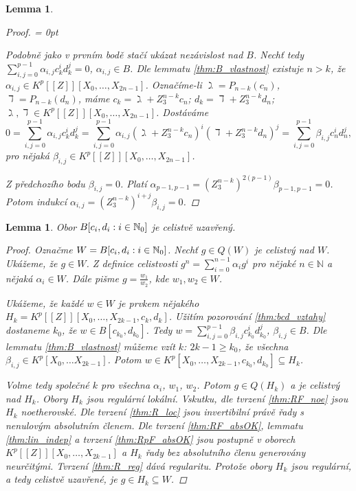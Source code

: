 \documentclass[11pt,a4paper]{article}
\newcommand\m[1]{\mathbb { #1 }} %
\newcommand\N{\m N}
\newcommand*{\mld}[1]{\[#1\]} %
\newenvironment{items}{%
	\itemize
	\itemsep = 0pt%
}{%
	\enditemize
}
\newcounter{numb}
\theoremstyle{definition}
\theoremstyle{plain}
\newtheorem{lemma}[numb]{Lemma}
\begin{document}
\begin{lemma}
\begin{proof}
\begin{items}
			\newcommand*{\J}{_{i, j = 0}^{p - 1}}
			\item Podobně jako v prvním bodě stačí ukázat nezávislost nad $B$. Nechť tedy $\sum\J \alpha_{i, j} c_k^i d_k^j = 0$, $\alpha_{i, j} \in B$. Dle lemmatu \ref{thm:B_vlastnost} existuje $n > k$, že $\alpha_{i, j} \in K^p[[Z]][X_0, \hdots, X_{2n - 1}]$. Označíme-li $\gimel = P_{n - k}(c_n)$, $\daleth = P_{n - k}(d_n)$, máme $c_k = \gimel + Z_3^{n - k} c_n$; $d_k = \daleth + Z_3^{n - k} d_n$; $\gimel, \daleth \in K^p[[Z]][X_0, \hdots, X_{2n - 1}]$. Dostáváme
			\mld{
				0 = \sum\J \alpha_{i, j} c_k^i d_k^j = \sum\J \alpha_{i, j} (\gimel + Z_3^{n - k} c_n)^i (\daleth + Z_3^{n - k} d_n)^j = \sum\J \beta_{i, j} c_n^i d_n^j,
			}
			pro nějaká $\beta_{i, j} \in K^p[[Z]][X_0, \hdots, X_{2n - 1}]$.

			Z předchozího bodu $\beta_{i, j} = 0$. Platí $\alpha_{p - 1, p - 1} = (Z_3^{n - k})^{2(p - 1)} \beta_{p - 1, p - 1} = 0$. Potom indukcí $\alpha_{i, j} = (Z_3^{n - k})^{i + j} \beta_{i, j} = 0$.
			\qedhere
		\end{items}
	\end{proof}
\end{lemma}

\begin{lemma} \label{thm:Bcdall_icl}
	Obor $\Bcdall$ je celistvě uzavřený.
	
	\begin{proof}
		\newcommand*{\I}{_{i = 0}^{n - 1}}
		
		Označme $W = \Bcdall$. Nechť $g \in Q(W)$ je celistvý nad $W$. Ukážeme, že $g \in W$. Z definice celistvosti $g^n = \sum\I \alpha_i g^i$ pro nějaké $n \in \N$ a nějaká $\alpha_i \in W$. Dále pišme $g = \frac{w_1}{w_2}$, kde $w_1, w_2 \in W$.
		
		Ukážeme, že každé $w \in W$ je prvkem nějakého $H_k = K^p[[Z]][X_0, \hdots, X_{2k - 1}, c_k, d_k]$.	Užitím pozorování \ref{thm:bcd_vztahy} dostaneme $k_0$, že $w \in B[c_{k_0}, d_{k_0}]$. Tedy $w = \sum_{i, j = 0}^{p - 1} \beta_{i, j} c_{k_0}^i d_{k_0}^j$, $\beta_{i, j} \in B$. Dle lemmatu \ref{thm:B_vlastnost} můžeme vzít $k$: $2k - 1 \geq k_0$, že všechna $\beta_{i, j} \in K^p[X_0, \hdots X_{2k - 1}]$. Potom $w \in K^p[X_0, \hdots, X_{2k - 1}, c_{k_0}, d_{k_0}] \subseteq H_k$.
		
		Volme tedy společné $k$ pro všechna $\alpha_i$, $w_1$, $w_2$. Potom $g \in Q(H_k)$ a je celistvý nad $H_k$. Obory $H_k$ jsou regulární lokální. Vskutku, dle tvrzení \ref{thm:RF_noe} jsou $H_k$ noetherovské. Dle tvrzení \ref{thm:R_loc} jsou invertibilní právě řady s nenulovým absolutním členem. Dle tvrzení \ref{thm:RF_absOK}, lemmatu \ref{thm:lin_indep} a tvrzení \ref{thm:RpF_absOK} jsou postupně v oborech $K^p[[Z]][X_0, \hdots, X_{2k - 1}]$ a $H_k$ řady bez absolutního členu generovány neurčitými. Tvrzení \ref{thm:R_reg} dává regularitu. Protože obory $H_k$ jsou regulární, a tedy celistvě uzavřené, je $g \in H_k \subseteq W$.
	\end{proof}
\end{lemma}
\end{document}
